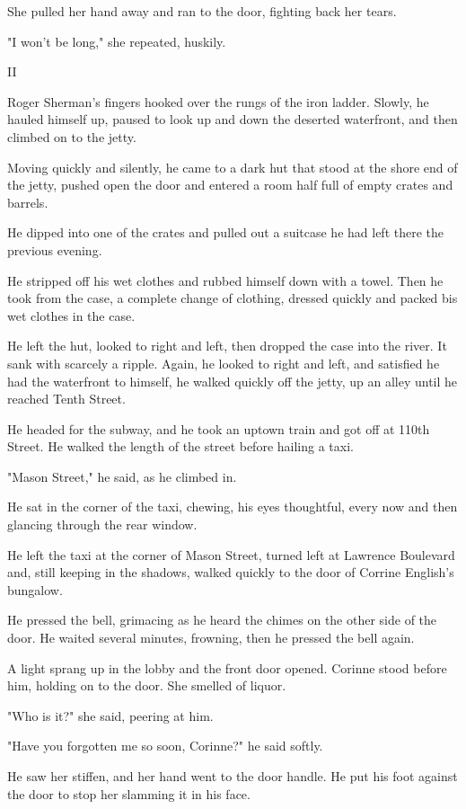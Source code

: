 \documentclass{novel}
\begin{document}
She pulled her hand away and ran to the door, fighting back her tears.

"I won't be long," she repeated, huskily.



II

Roger Sherman's fingers hooked over the rungs of the iron ladder. Slowly, he hauled himself up, paused to look up and down the deserted waterfront, and then climbed on to the jetty.

Moving quickly and silently, he came to a dark hut that stood at the shore end of the jetty, pushed open the door and entered a room half full of empty crates and barrels.

He dipped into one of the crates and pulled out a suitcase he had left there the previous evening.

He stripped off his wet clothes and rubbed himself down with a towel. Then he took from the case, a complete change of clothing, dressed quickly and packed bis wet clothes in the case.

He left the hut, looked to right and left, then dropped the case into the river. It sank with scarcely a ripple. Again, he looked to right and left, and satisfied he had the waterfront to himself, he walked quickly off the jetty, up an alley until he reached Tenth Street.

He headed for the subway, and he took an uptown train and got off at 110th Street. He walked the length of the street before hailing a taxi.

"Mason Street," he said, as he climbed in.

He sat in the corner of the taxi, chewing, his eyes thoughtful, every now and then glancing through the rear window.

He left the taxi at the corner of Mason Street, turned left at Lawrence Boulevard and, still keeping in the shadows, walked quickly to the door of Corrine English's bungalow.

He pressed the bell, grimacing as he heard the chimes on the other side of the door. He waited several minutes, frowning, then he pressed the bell again.

A light sprang up in the lobby and the front door opened. Corinne stood before him, holding on to the door. She smelled of liquor.

"Who is it?" she said, peering at him.

"Have you forgotten me so soon, Corinne?" he said softly.

He saw her stiffen, and her hand went to the door handle. He put his foot against the door to stop her slamming it in his face.
\end{document}
